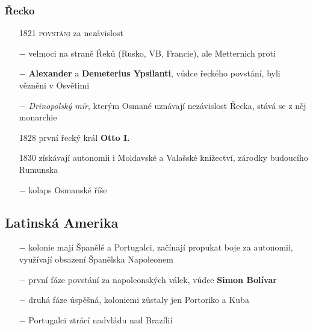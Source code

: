\documentclass{article}
\begin{document}
\subsubsection*{Řecko}
\begin{itemize}
    \vspace{-0.5em}
    \setlength\itemsep{0.15em}
    \item[1821] \textsc{povstání} za nezávislost
    \item[$-$] velmoci na straně Řeků (Rusko, VB, Francie), ale Metternich proti
    \item[$-$] \textbf{Alexander} a \textbf{Demeterius Ypsilanti}, vůdce řeckého povstání, byli vězněni v Osvětimi
    \item[$-$] \textit{Drinopolský mír}, kterým Osmané uznávají nezávislost Řecka, stává se z něj monarchie
    \item[1828] první řecký král \textbf{Otto I.}
    \item[1830] získávají autonomii i Moldavské a Valašské knížectví, zárodky budoucího Rumunska
    \item[$-$] kolaps Osmanské říše
\end{itemize}

\subsection*{Latinská Amerika}
\begin{itemize}
    \vspace{-0.5em}
    \setlength\itemsep{0.15em}
    \item[$-$] kolonie mají Španělé a Portugalci, začínají propukat boje za autonomii, využívají obsazení Španělska Napoleonem
    \item[$-$] první fáze povstání za napoleonských válek, vůdce \textbf{Simon Bolívar}
    \item[$-$] druhá fáze úspěšná, koloniemi zůstaly jen Portoriko a Kuba
    \item[$-$] Portugalci ztrácí nadvládu nad Brazílií
\end{itemize}
\end{document}
